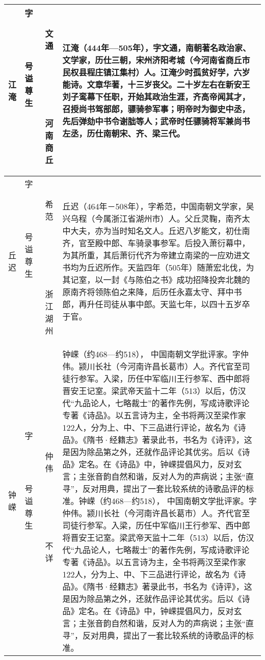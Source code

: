 \begin{longtable}{|>{\centering\namefont\heiti}m{2em}|>{\centering\tiny}m{3.0em}|>{\xzfont\kaiti}m{7em}|}
    江淹 & \begin{description}
    \item[字] 文通
    \item[号] 
    \item[谥] 
    \item[尊] 
    \item[生]河南商丘
    \end{description} & 江淹（444年—505年），字文通，南朝著名政治家、文学家，历仕三朝，宋州济阳考城（今河南省商丘市民权县程庄镇江集村）人。江淹少时孤贫好学，六岁能诗。文章华著，十三岁丧父。二十岁左右在新安王刘子鸾幕下任职，开始其政治生涯，齐高帝闻其才，召授尚书驾部郎，骠骑参军事；明帝时为御史中丞，先后弹劾中书令谢朏等人；武帝时任骠骑将军兼尚书左丞，历仕南朝宋、齐、梁三代。 \tabularnewline\hline
    丘迟 & \begin{description}
    \item[字] 希范
    \item[号] 
    \item[谥] 
    \item[尊] 
    \item[生] 浙江湖州
    \end{description} & 丘迟（464年－508年），字希范，中国南朝文学家，吴兴乌程（今属浙江省湖州市）人。父丘灵鞠，南齐太中大夫，亦为当时知名文人。丘迟八岁能文，初仕南齐，官至殿中郎、车骑录事参军。后投入萧衍幕中，为其所重，其后萧衍代齐为帝建立南梁的一应劝进文书均为丘迟所作。天监四年（505年）随萧宏北伐，为其记室，以一封《与陈伯之书》成功招降投奔北魏的原南齐将领陈伯之来降，后历任永嘉太守、拜中书郎，再升任司徒从事中郎。天监七年，以四十五岁卒于官。 \tabularnewline\hline
    钟嵘 & \begin{description}
    \item[字] 仲伟
    \item[号] 
    \item[谥] 
    \item[尊] 
    \item[生] 不详
    \end{description} & 钟嵘（约468—约518）， 中国南朝文学批评家。字仲伟。颍川长社（今河南许昌长葛市）人。齐代官至司徒行参军。入梁，历任中军临川王行参军、西中郎将晋安王记室。梁武帝天监十二年（513）以后，仿汉代“九品论人，七略裁士”的著作先例，写成诗歌评论专著《诗品》。以五言诗为主，全书将两汉至梁作家122人，分为上、中、下三品进行评论，故名为《诗品》。《隋书·经籍志》著录此书，书名为《诗评》，这是因为除品第之外，还就作品评论其优劣。后以《诗品》定名。在《诗品》中，钟嵘提倡风力，反对玄言；主张音韵自然和谐，反对人为的声病说；主张“直寻”，反对用典，提出了一套比较系统的诗歌品评的标准。钟嵘（约468—约518）， 中国南朝文学批评家。字仲伟。颍川长社（今河南许昌长葛市）人。齐代官至司徒行参军。入梁，历任中军临川王行参军、西中郎将晋安王记室。梁武帝天监十二年（513）以后，仿汉代“九品论人，七略裁士”的著作先例，写成诗歌评论专著《诗品》。以五言诗为主，全书将两汉至梁作家122人，分为上、中、下三品进行评论，故名为《诗品》。《隋书·经籍志》著录此书，书名为《诗评》，这是因为除品第之外，还就作品评论其优劣。后以《诗品》定名。在《诗品》中，钟嵘提倡风力，反对玄言；主张音韵自然和谐，反对人为的声病说；主张“直寻”，反对用典，提出了一套比较系统的诗歌品评的标准。 \tabularnewline\hline


\end{longtable}
